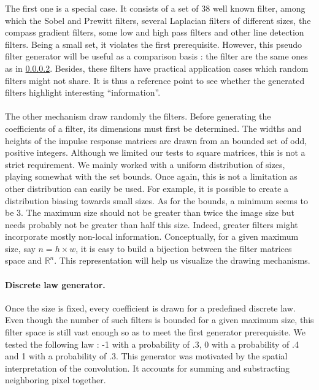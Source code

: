 \documentclass[a4paper]{report}
\begin{document}
			The first one is a special case. It consists of a set of 38 well known filter, among which the Sobel and Prewitt filters, several Laplacian filters of different sizes, the compass gradient filters, some low and high pass filters and other line detection filters.
			Being a small set, it violates the first prerequisite. However, this pseudo filter generator will be useful as a comparison basis : the filter are the same ones as in \ref{}. Besides, these filters have practical application cases which random filters might not share. It is thus a reference point to see whether the generated filters highlight interesting ``information''.
			\paragraph{}
			The other mechanism draw randomly the filters. Before generating the coefficients of a filter, its dimensions must first be determined. The widths and heights of the impulse response matrices are drawn from an bounded set of odd, positive integers. Although we limited our tests to square matrices, this is not a strict requirement.
			We mainly worked with a uniform distribution of sizes, playing somewhat with the set bounds. Once again, this is not a limitation as other distribution can easily be used. For example, it is possible to create a distribution biasing towards small sizes. 
			As for the bounds, a minimum seems to be 3. The maximum size should not be greater than twice the image size but needs probably not be greater than half this size. Indeed, greater filters might incorporate mostly non-local information.
			Conceptually, for a given maximum size, say $n = h \times w$, it is easy to build a bijection between the filter matrices space and $\mathbb{R}^n$. This representation will help us visualize the drawing mechanisms.
			\paragraph{Discrete law generator.}
			Once the size is fixed, every coefficient is drawn for a predefined discrete law. Even though the number of such filters is bounded for a given maximum size, this filter space is still vast enough so as to meet the first generator prerequisite. We tested the following law : -1 with a probability of .3, 0 with a probability of .4 and 1 with a probability of .3.
			This generator was motivated by the spatial interpretation of the convolution. It accounts for summing and substracting neighboring pixel together.
\end{document}
